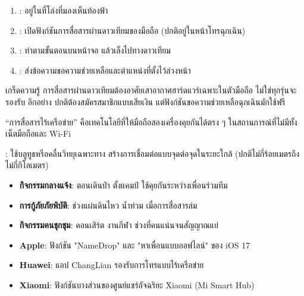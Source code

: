 
\begin{enumerate}
  \item : อยู่ในที่โล่งที่มองเห็นท้องฟ้า
  \item : เปิดฟังก์ชันการสื่อสารผ่านดาวเทียมของมือถือ (ปกติอยู่ในหน้าโทรฉุกเฉิน)
  \item : ทำตามขั้นตอนบนหน้าจอ แล้วเล็งไปทางดาวเทียม
  \item : ส่งข้อความขอความช่วยเหลือและตำแหน่งที่ตั้งไว้ล่วงหน้า
\end{enumerate}

\begin{tcbinfo}{เกร็ดความรู้}
การสื่อสารผ่านดาวเทียมต้องอาศัยเสาอากาศฮาร์ดแวร์เฉพาะในตัวมือถือ ไม่ใช่ทุกรุ่นจะรองรับ อีกอย่าง ปกติต้องสมัครสมาชิกแบบเสียเงิน แต่ฟังก์ชันขอความช่วยเหลือฉุกเฉินมักใช้ฟรี

\end{tcbinfo}


“การสื่อสารไร้เครือข่าย” คือเทคโนโลยีที่ให้มือถือสองเครื่องคุยกันได้ตรง ๆ ในสถานการณ์ที่ไม่มีทั้งเน็ตมือถือและ Wi-Fi


: ใช้บลูทูธหรือคลื่นวิทยุเฉพาะทาง สร้างการเชื่อมต่อแบบจุดต่อจุดในระยะใกล้ (ปกติไม่กี่ร้อยเมตรถึงไม่กี่กิโลเมตร)


\begin{itemize}
  \item \textbf{กิจกรรมกลางแจ้ง}: ตอนเดินป่า ตั้งแคมป์ ใช้คุยกันระหว่างเพื่อนร่วมทีม
  \item \textbf{การกู้ภัยภัยพิบัติ}: ช่วงแผ่นดินไหว น้ำท่วม เมื่อการสื่อสารล่ม
  \item \textbf{กิจกรรมคนชุกชุม}: คอนเสิร์ต งานกีฬา ช่วงที่คนแน่นจนสัญญาณแย่
\end{itemize}


\begin{itemize}
  \item \textbf{Apple}: ฟังก์ชัน "NameDrop" และ "หาเพื่อนแบบออฟไลน์" ของ iOS 17
  \item \textbf{Huawei}: แอป ChangLian รองรับการโทรแบบไร้เครือข่าย
  \item \textbf{Xiaomi}: ฟังก์ชันบางส่วนของศูนย์แชร์อัจฉริยะ Xiaomi (Mi Smart Hub)
\end{itemize}

